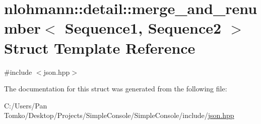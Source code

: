 \hypertarget{structnlohmann_1_1detail_1_1merge__and__renumber}{}\section{nlohmann\+::detail\+::merge\+\_\+and\+\_\+renumber$<$ Sequence1, Sequence2 $>$ Struct Template Reference}
\label{structnlohmann_1_1detail_1_1merge__and__renumber}


{\ttfamily \#include $<$json.\+hpp$>$}



The documentation for this struct was generated from the following file\+:\begin{DoxyCompactItemize}
\item 
C\+:/\+Users/\+Pan Tomko/\+Desktop/\+Projects/\+Simple\+Console/\+Simple\+Console/include/\mbox{\hyperlink{json_8hpp}{json.\+hpp}}\end{DoxyCompactItemize}
